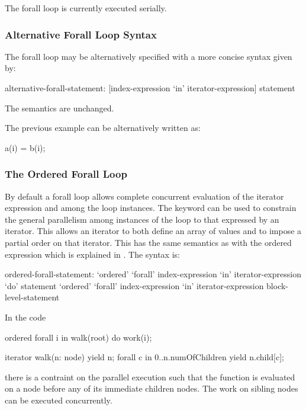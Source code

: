 \begin{status}
The forall loop is currently executed serially.
\end{status}

\subsubsection{Alternative Forall Loop Syntax}
\label{Alternative_Forall_Loop_Syntax}

The forall loop may be alternatively specified with a more concise
syntax given by:
\begin{syntax}
alternative-forall-statement:
  [index-expression `in' iterator-expression] statement
\end{syntax}
The semantics are unchanged.

\begin{example}
The previous  example can be alternatively written as:
\begin{chapel}
[i in 1..N] a(i) = b(i);
\end{chapel}
\end{example}

\subsubsection{The Ordered Forall Loop}
\label{Ordered_Forall}

By default a forall loop allows complete concurrent evaluation of the
iterator expression and among the loop instances. The
keyword  can be used to constrain the general
parallelism among instances of the loop to that expressed by an
iterator. This allows an iterator to both define an array of values
and to impose a partial order on that iterator.  This has the same
semantics as with the ordered expression which is explained
in .  The syntax is:
\begin{syntax}
ordered-forall-statement:
   `ordered' `forall' index-expression `in' iterator-expression `do' statement
   `ordered' `forall' index-expression `in' iterator-expression block-level-statement
\end{syntax}

\begin{example}
In the code
\begin{chapel}
ordered forall i in walk(root) do
  work(i);

iterator walk(n: node) {
  yield n;
  forall c in 0..n.numOfChildren {
      yield n.child[c];
  }
}
\end{chapel}
there is a contraint on the parallel execution such that the
function  is evaluated on a node before any of its
immediate children nodes.  The work on sibling nodes can be executed
concurrently.
\end{example}

